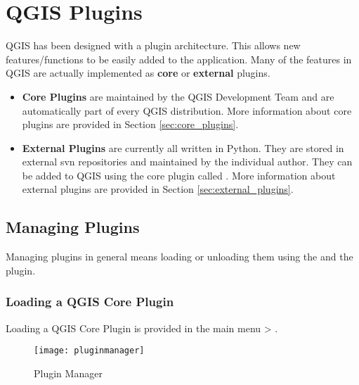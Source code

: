 
\section{QGIS Plugins}\label{sec:plugins}

\updatedisclaimer

QGIS has been designed with a plugin architecture.
This allows new features/functions to be easily added to the application.
Many of the features in QGIS are actually implemented as \textbf{core} or \textbf{external} plugins. 

\begin{itemize}
\item \textbf{Core Plugins} are maintained by the QGIS Development Team and are automatically part of every QGIS distribution.
More information about core plugins are provided in Section \ref{sec:core_plugins}.
\item \textbf{External Plugins} are currently all written in Python.
They are stored in external svn repositories and maintained by the individual author.
They can be added to QGIS using the core plugin called .
More information about external plugins are provided in Section \ref{sec:external_plugins}.
\end{itemize}

\subsection{Managing Plugins}\label{sec:managing_plugins}

Managing plugins in general means loading or unloading them using the  and the  plugin. 

\subsubsection{Loading a QGIS Core Plugin}\label{sec:load_core_plugin} 

Loading a QGIS Core Plugin is provided in the main menu  > .

\begin{figure}[ht]
   \begin{center}
   \caption{Plugin Manager \nixcaption}\label{fig:pluginmanager}\smallskip
   \texttt{[image: pluginmanager]}
\end{center}
\end{figure}

